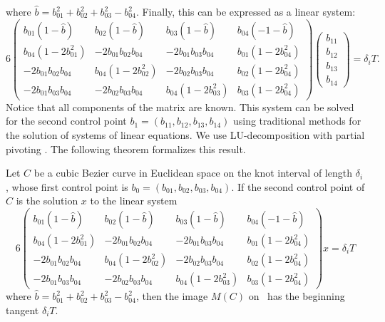 where $\hat{b} = b_{01}^2 + b_{02}^2 + b_{03}^2 - b_{04}^2$.
Finally, this can be expressed as a linear system:
\[
6 \left( \begin{array}{cccc}
b_{01}(1-\hat{b}) & b_{02}(1-\hat{b}) & b_{03}(1-\hat{b}) & b_{04}(-1-\hat{b}) \\
b_{04}(1-2b_{01}^2) & -2b_{01}b_{02}b_{04} & -2b_{01}b_{03}b_{04} & b_{01}(1-2b_{04}^2) \\
-2b_{01}b_{02}b_{04} & b_{04} (1-2b_{02}^2) & -2b_{02}b_{03}b_{04} & b_{02}(1-2b_{04}^2) \\
-2b_{01}b_{03}b_{04} & -2b_{02}b_{03}b_{04} & b_{04}(1-2b_{03}^2) & b_{03}(1-2b_{04}^2)
\end{array} \right)
\left( \begin{array}{c} b_{11} \\ b_{12} \\ b_{13} \\ b_{14} \end{array} \right)
= \delta_i T.
\]
%
Notice that all components of the matrix are known.
This system can be solved for the second control point $b_1 = (b_{11},b_{12},b_{13},b_{14})$
using traditional methods for the solution of systems of linear
equations.
We use LU-decomposition with partial pivoting \cite{golubvanloan89}.
The following theorem formalizes this result.

\begin{theorem}
Let $C$ be a cubic Bezier curve in Euclidean space 
on the knot interval of length $\delta_i$,
whose first control
point is $b_0 = (b_{01}, b_{02}, b_{03}, b_{04})$.
If the second control point of $C$ is the solution $x$ to the linear system
\[
6 \left( \begin{array}{cccc}
b_{01}(1-\hat{b}) & b_{02}(1-\hat{b}) & b_{03}(1-\hat{b}) & b_{04}(-1-\hat{b}) \\
b_{04}(1-2b_{01}^2) & -2b_{01}b_{02}b_{04} & -2b_{01}b_{03}b_{04} & b_{01}(1-2b_{04}^2) \\
-2b_{01}b_{02}b_{04} & b_{04} (1-2b_{02}^2) & -2b_{02}b_{03}b_{04} & b_{02}(1-2b_{04}^2) \\
-2b_{01}b_{03}b_{04} & -2b_{02}b_{03}b_{04} & b_{04}(1-2b_{03}^2) & b_{03}(1-2b_{04}^2)
\end{array} \right)
x
= \delta_i T
\]
where $\hat{b} = b_{01}^2 + b_{02}^2 + b_{03}^2 - b_{04}^2$,
then the image $M(C)$ on \ has the beginning tangent $\delta_i T$.
\end{theorem}


